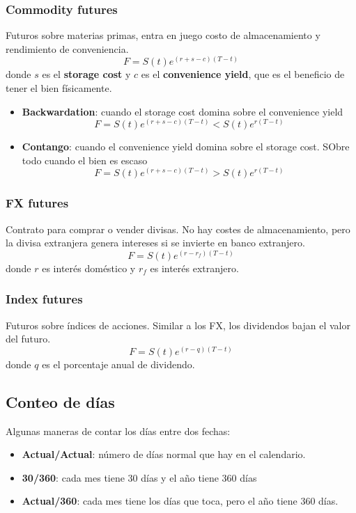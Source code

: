 \subsubsection{Commodity futures}
Futuros sobre materias primas, entra en juego costo de almacenamiento y rendimiento de conveniencia.
\[F=S(t)e^{(r+s-c)(T-t)}\]
donde $s$ es el \textbf{storage cost} y $c$ es el \textbf{convenience yield}, que es el beneficio de tener el bien físicamente.
\begin{itemize}
    \item \textbf{Backwardation}: cuando el storage cost domina sobre el convenience yield
    \[F=S(t)e^{(r+s-c)(T-t)}<S(t)e^{r(T-t)}\]
    \item \textbf{Contango}: cuando el convenience yield domina sobre el storage cost. SObre todo cuando el bien es escaso
    \[F=S(t)e^{(r+s-c)(T-t)}>S(t)e^{r(T-t)}\]
\end{itemize}


\subsubsection{FX futures}
Contrato para comprar o vender divisas. No hay costes de almacenamiento, pero la divisa extranjera genera intereses si se invierte en banco extranjero.
\[F=S(t)e^{(r-r_f)(T-t)}\]
donde $r$ es interés doméstico y $r_f$ es interés extranjero.


\subsubsection{Index futures}
Futuros sobre índices de acciones. Similar a los FX, los dividendos bajan el valor del futuro.
\[F=S(t)e^{(r-q)(T-t)}\]
donde $q$ es el porcentaje anual de dividendo.






\subsection{Conteo de días}
Algunas maneras de contar los días entre dos fechas:
\begin{itemize}
    \item \textbf{Actual/Actual}: número de días normal que hay en el calendario.
    \item \textbf{30/360}: cada mes tiene 30 días y el año tiene 360 días
    \item \textbf{Actual/360}: cada mes tiene los días que toca, pero el año tiene 360 días.
\end{itemize}



